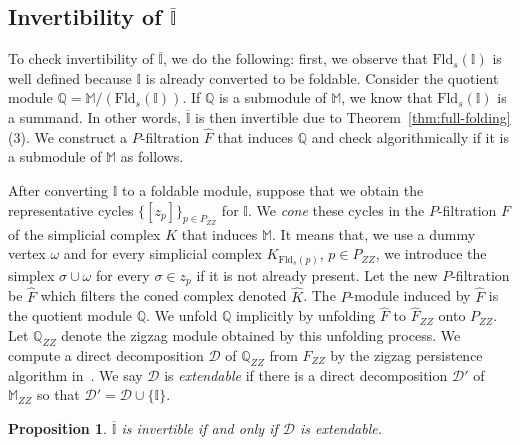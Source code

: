 \documentclass[11pt]{article}
\theoremstyle{plain}%
\newtheorem{proposition}{Proposition}[section]
\newcommand{\Int}{\mathbb{I}}
\newcommand{\M}{\mathbb{M}}
\newcommand{\Q}{\mathbb{Q}}
\newcommand{\D}{\mathcal{D}}
\newcommand{\Fld}{\mathrm{Fld}}
\begin{document}
\subsection{Invertibility of $\overline{\Int}$}
To check invertibility of $\overline{\Int}$, we do the following: first, we observe that $\Fld_s(\Int)$ is well defined because $\Int$ is already converted to be foldable.
Consider the quotient module $\Q=\M/(\Fld_s(\Int))$. If $\Q$ is a submodule
of $\M$, we know that $\Fld_s(\Int)$ is a summand. In other words, $\overline{\Int}$
is then invertible due to Theorem~\ref{thm:full-folding}(3). We construct a $P$-filtration $\hat{F}$ that induces $\Q$ and check algorithmically if it is a submodule of $\M$ as follows.

After converting $\Int$ to a foldable module, suppose that we obtain the representative cycles $\{[z_p]\}_{p\in P_{ZZ}}$ for $\Int$. We \emph{cone} these cycles in the $P$-filtration $F$ of the
simplicial complex $K$ that induces $\M$. It means that, we use a dummy vertex $\omega$ and for every simplicial complex
$K_{\Fld_s(p)}$, $p\in P_{ZZ}$, we introduce the simplex $\sigma\cup {\omega}$ for
every $\sigma\in z_p$ if it is not already present. Let the new $P$-filtration be 
$\hat{F}$ which filters the coned complex denoted $\hat{K}$. The $P$-module
induced by $\hat{F}$ is the quotient module $\Q$. We unfold $\Q$ implicitly
by unfolding $\hat{F}$ to $\hat{F}_{ZZ}$ onto $P_{ZZ}$. 
Let $\Q_{ZZ}$ denote the zigzag module
obtained by this unfolding process. We compute a direct decomposition $\D$
of $\Q_{ZZ}$ from $\hat{F}_{ZZ}$ by the zigzag persistence algorithm in~\cite{DHM25}.
We say $\D$ is \emph{extendable} if there is a direct decomposition
$\D'$ of $\M_{ZZ}$ so that $\D'=\D\cup\{\Int\}$. 
\begin{proposition}
$\overline{\Int}$ is invertible if and only if $\D$ is extendable.
\label{prop:extendable}
\end{proposition}
\end{document}
